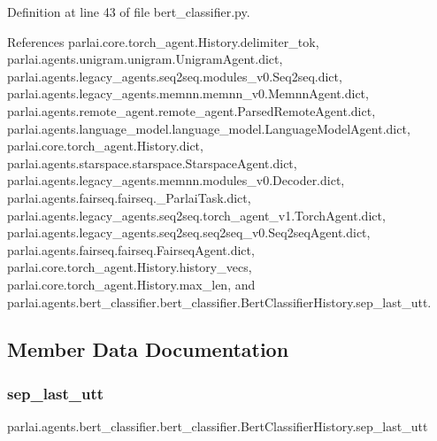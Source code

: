 Definition at line 43 of file bert\+\_\+classifier.\+py.



References parlai.\+core.\+torch\+\_\+agent.\+History.\+delimiter\+\_\+tok, parlai.\+agents.\+unigram.\+unigram.\+Unigram\+Agent.\+dict, parlai.\+agents.\+legacy\+\_\+agents.\+seq2seq.\+modules\+\_\+v0.\+Seq2seq.\+dict, parlai.\+agents.\+legacy\+\_\+agents.\+memnn.\+memnn\+\_\+v0.\+Memnn\+Agent.\+dict, parlai.\+agents.\+remote\+\_\+agent.\+remote\+\_\+agent.\+Parsed\+Remote\+Agent.\+dict, parlai.\+agents.\+language\+\_\+model.\+language\+\_\+model.\+Language\+Model\+Agent.\+dict, parlai.\+core.\+torch\+\_\+agent.\+History.\+dict, parlai.\+agents.\+starspace.\+starspace.\+Starspace\+Agent.\+dict, parlai.\+agents.\+legacy\+\_\+agents.\+memnn.\+modules\+\_\+v0.\+Decoder.\+dict, parlai.\+agents.\+fairseq.\+fairseq.\+\_\+\+Parlai\+Task.\+dict, parlai.\+agents.\+legacy\+\_\+agents.\+seq2seq.\+torch\+\_\+agent\+\_\+v1.\+Torch\+Agent.\+dict, parlai.\+agents.\+legacy\+\_\+agents.\+seq2seq.\+seq2seq\+\_\+v0.\+Seq2seq\+Agent.\+dict, parlai.\+agents.\+fairseq.\+fairseq.\+Fairseq\+Agent.\+dict, parlai.\+core.\+torch\+\_\+agent.\+History.\+history\+\_\+vecs, parlai.\+core.\+torch\+\_\+agent.\+History.\+max\+\_\+len, and parlai.\+agents.\+bert\+\_\+classifier.\+bert\+\_\+classifier.\+Bert\+Classifier\+History.\+sep\+\_\+last\+\_\+utt.



\subsection{Member Data Documentation}
\mbox{\label{classparlai_1_1agents_1_1bert__classifier_1_1bert__classifier_1_1BertClassifierHistory_ab53ecd52f1f23b1ea488637cc8fd8068}} 
\subsubsection{\texorpdfstring{sep\+\_\+last\+\_\+utt}{sep\_last\_utt}}
{\footnotesize\ttfamily parlai.\+agents.\+bert\+\_\+classifier.\+bert\+\_\+classifier.\+Bert\+Classifier\+History.\+sep\+\_\+last\+\_\+utt}



